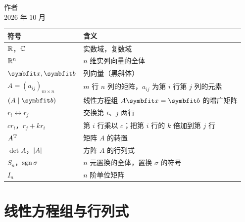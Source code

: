 \documentclass{mojing-book}
\begin{document}
\begin{flushright}
作\quad 者\\
2026 年 10 月
\end{flushright}

\tableofcontents


\begin{center}
\renewcommand\arraystretch{1.35}
\begin{tabular}{@{}p{}p{}@{}}
\toprule
符号 & 含义 \\
\midrule
$\mathbb{R}$，$\mathbb{C}$            & 实数域，复数域 \\
$\mathbb{R}^n$                & $n$ 维实列向量的全体 \\
$\vb{x},\vb{b}$       & 列向量（黑斜体） \\
$A=(a_{ij})_{m\times n}$ & $m$ 行 $n$ 列的矩阵，$a_{ij}$ 为第 $i$ 行第 $j$ 列的元素 \\
$(A\mid\vb{b})$       & 线性方程组 $A\vb{x}=\vb{b}$ 的增广矩阵 \\
$r_i\leftrightarrow r_j$ & 交换第 $i$、$j$ 两行 \\
$cr_i$，$r_j+kr_i$    & 第 $i$ 行乘以 $c$；把第 $i$ 行的 $k$ 倍加到第 $j$ 行 \\
$A^{\mathrm{T}}$                 & 矩阵 $A$ 的转置 \\
$\det A$，$\lvert A\rvert$   & 方阵 $A$ 的行列式 \\
$S_n$，$\operatorname{sgn}\sigma$   & $n$ 元置换的全体，置换 $\sigma$ 的符号 \\
$I_n$                 & $n$ 阶单位矩阵 \\
\bottomrule
\end{tabular}
\end{center}

\mainmatter
\part{线性方程组与行列式}




\backmatter

\printreferences
\printindex
\end{document}
